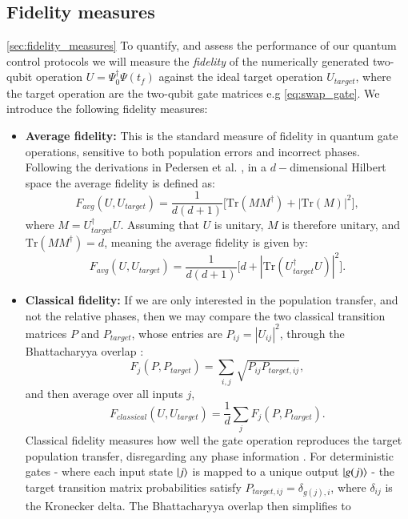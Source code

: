 \documentclass{subfiles}
\begin{document}
\subsection{Fidelity measures}\ref{sec:fidelity_measures}
To quantify, and assess the performance of our quantum control protocols we will measure the \emph{fidelity} of the numerically generated two-qubit operation $U = \Psi_0^\dagger\Psi(t_f)$ against the ideal target operation $U_{target}$, where the target operation are the two-qubit gate matrices e.g \eqref{eq:swap_gate}. 
We introduce the following fidelity measures:
\begin{itemize}
    \item \textbf{Average fidelity:} This is the standard measure of fidelity in quantum gate operations, sensitive to both population errors and incorrect phases. Following the derivations in Pedersen et al. \cite{pedersen2007fidelity}, in a $d-$dimensional Hilbert space the average fidelity is defined as:
    \begin{equation*}
    F_{avg}(U, U_{target}) = \frac{1}{d(d+1)}\bigg[\text{Tr}(MM^\dagger) + |\text{Tr}(M)|^2\bigg],
    \end{equation*}
    where $M = U_{target}^\dagger U$. Assuming that $U$ is unitary, $M$ is therefore unitary, and $\text{Tr}(MM^\dagger) = d$, meaning the average fidelity is given by:
    \begin{equation}
        F_{avg}(U, U_{target}) = \frac{1}{d(d+1)}\bigg[d + |\text{Tr}(U_{target}^\dagger U)|^2\bigg]\label{eq:avg_fidelity}.
    \end{equation}
    \item \textbf{Classical fidelity:} If we are only interested in the population transfer, and not the relative phases, then we may compare the two classical transition matrices $P$ and $P_{target}$, whose entries are $P_{ij} = |U_{ij}|^2$, through the Bhattacharyya overlap \cite{bhattacharyya1943measure}:
    \begin{equation*}
        F_j(P, P_{target}) = \sum_{i,j} \sqrt{P_{ij} P_{target,ij}},
    \end{equation*}
    and then average over all inputs $j$,
    \begin{equation}
        F_{classical}(U, U_{target}) = \frac{1}{d}\sum_j F_j(P, P_{target})\label{eq:classical_fidelity}. 
    \end{equation} 
    Classical fidelity measures how well the gate operation reproduces the target population transfer, disregarding any phase information \cite{nielsen2010quantum}. For deterministic gates - where each input state $\ket{j}$ is mapped to a unique output $\ket{g(j)}$ - the target transition matrix probabilities satisfy $P_{target,ij} = \delta_{g(j),i}$, where $\delta_{ij}$ is the Kronecker delta. The Bhattacharyya overlap then simplifies to

\end{itemize}
\end{document}
